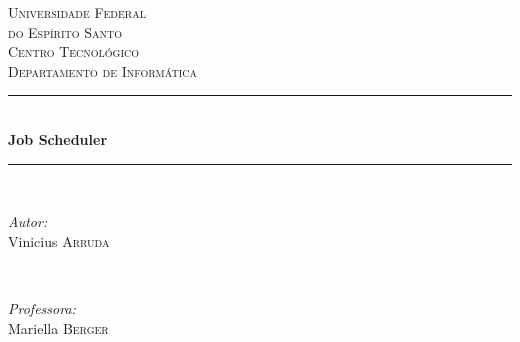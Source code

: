 \documentclass[a4paper,12pt]{article}
\begin{document}
 



\begin{titlepage}

\newcommand{\HRule}{\rule{\linewidth}{0.5mm}} %

\center %



\textsc{\LARGE Universidade Federal\\do Espírito Santo}\\[1.5cm] %
\textsc{\Large Centro Tecnológico}\\[0.5cm] %
\textsc{\large Departamento de Informática}\\[0.5cm] %


\HRule \\[0.4cm]
{ \huge \bfseries Job Scheduler}\\[0.4cm] %
\HRule \\[1.5cm]


\begin{minipage}{0.4\textwidth}
\begin{flushleft} \large
\emph{Autor:}\\
Vinicius \textsc{Arruda}
\end{flushleft}
\end{minipage}
~
\begin{minipage}{0.4\textwidth}
\begin{flushright} \large
\emph{Professora:} \\
Mariella \textsc{Berger} %
\end{flushright}
\end{minipage}\\[2cm]


\end{titlepage}
\end{document}
